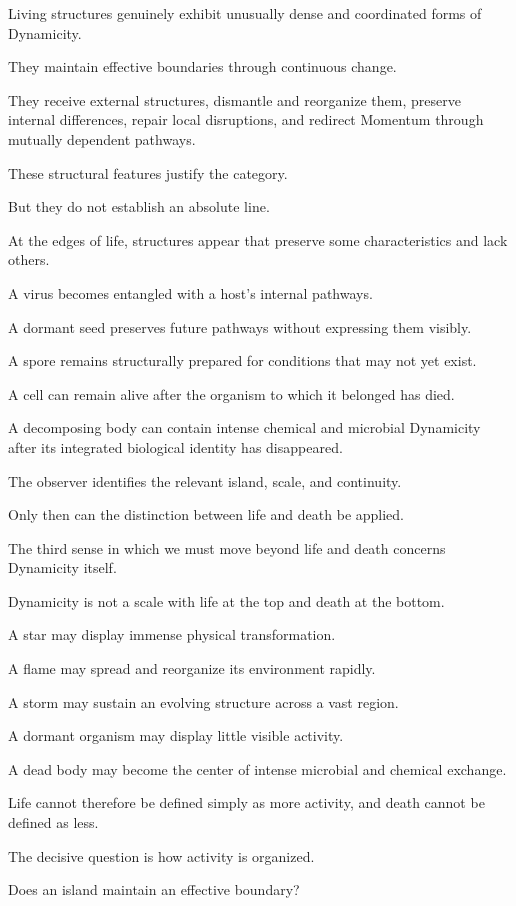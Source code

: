 Living structures genuinely exhibit unusually dense and coordinated forms of Dynamicity.

They maintain effective boundaries through continuous change.

They receive external structures, dismantle and reorganize them, preserve internal differences, repair local disruptions, and redirect Momentum through mutually dependent pathways.

These structural features justify the category.

But they do not establish an absolute line.

At the edges of life, structures appear that preserve some characteristics and lack others.

A virus becomes entangled with a host’s internal pathways.

A dormant seed preserves future pathways without expressing them visibly.

A spore remains structurally prepared for conditions that may not yet exist.

A cell can remain alive after the organism to which it belonged has died.

A decomposing body can contain intense chemical and microbial Dynamicity after its integrated biological identity has disappeared.

The observer identifies the relevant island, scale, and continuity.

Only then can the distinction between life and death be applied.

The third sense in which we must move beyond life and death concerns Dynamicity itself.

Dynamicity is not a scale with life at the top and death at the bottom.

A star may display immense physical transformation.

A flame may spread and reorganize its environment rapidly.

A storm may sustain an evolving structure across a vast region.

A dormant organism may display little visible activity.

A dead body may become the center of intense microbial and chemical exchange.

Life cannot therefore be defined simply as more activity, and death cannot be defined as less.

The decisive question is how activity is organized.

Does an island maintain an effective boundary?

